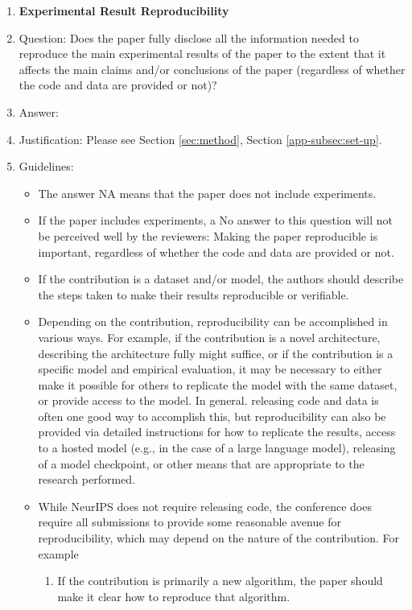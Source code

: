 \documentclass{article}
\begin{document}
\begin{enumerate}
    \item {\bf Experimental Result Reproducibility}
    \item[] Question: Does the paper fully disclose all the information needed to reproduce the main experimental results of the paper to the extent that it affects the main claims and/or conclusions of the paper (regardless of whether the code and data are provided or not)?
    \item[] Answer: \answerYes{} %
    \item[] Justification: Please see Section \ref{sec:method}, Section \ref{app-subsec:set-up}.
    \item[] Guidelines:
    \begin{itemize}
        \item The answer NA means that the paper does not include experiments.
        \item If the paper includes experiments, a No answer to this question will not be perceived well by the reviewers: Making the paper reproducible is important, regardless of whether the code and data are provided or not.
        \item If the contribution is a dataset and/or model, the authors should describe the steps taken to make their results reproducible or verifiable. 
        \item Depending on the contribution, reproducibility can be accomplished in various ways. For example, if the contribution is a novel architecture, describing the architecture fully might suffice, or if the contribution is a specific model and empirical evaluation, it may be necessary to either make it possible for others to replicate the model with the same dataset, or provide access to the model. In general. releasing code and data is often one good way to accomplish this, but reproducibility can also be provided via detailed instructions for how to replicate the results, access to a hosted model (e.g., in the case of a large language model), releasing of a model checkpoint, or other means that are appropriate to the research performed.
        \item While NeurIPS does not require releasing code, the conference does require all submissions to provide some reasonable avenue for reproducibility, which may depend on the nature of the contribution. For example
        \begin{enumerate}
            \item If the contribution is primarily a new algorithm, the paper should make it clear how to reproduce that algorithm.

\end{enumerate}
\end{itemize}
\end{enumerate}
\end{document}
